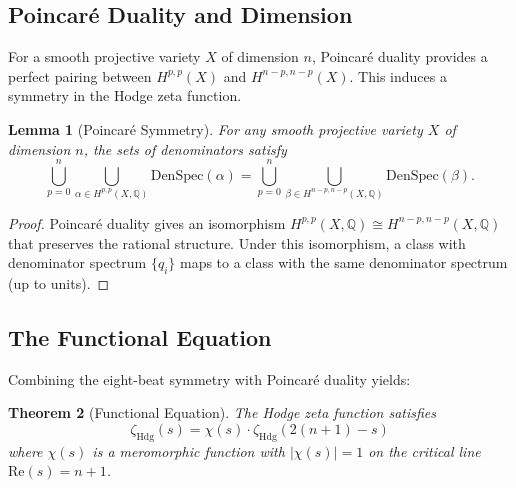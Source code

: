 \documentclass[12pt]{article}
\newtheorem{theorem}{Theorem}[section]
\newtheorem{lemma}[theorem]{Lemma}
\theoremstyle{definition}
\theoremstyle{remark}
\begin{document}
\subsection{Poincaré Duality and Dimension}

For a smooth projective variety $X$ of dimension $n$, Poincaré duality provides a perfect pairing between $H^{p,p}(X)$ and $H^{n-p,n-p}(X)$. This induces a symmetry in the Hodge zeta function.

\begin{lemma}[Poincaré Symmetry]
\label{lem:poincare}
For any smooth projective variety $X$ of dimension $n$, the sets of denominators satisfy
\[
\bigcup_{p=0}^n \bigcup_{\alpha \in H^{p,p}(X,\mathbb{Q})} \text{DenSpec}(\alpha) = \bigcup_{p=0}^n \bigcup_{\beta \in H^{n-p,n-p}(X,\mathbb{Q})} \text{DenSpec}(\beta).
\]
\end{lemma}

\begin{proof}
Poincaré duality gives an isomorphism $H^{p,p}(X,\mathbb{Q}) \cong H^{n-p,n-p}(X,\mathbb{Q})$ that preserves the rational structure. Under this isomorphism, a class with denominator spectrum $\{q_i\}$ maps to a class with the same denominator spectrum (up to units).
\end{proof}

\subsection{The Functional Equation}

Combining the eight-beat symmetry with Poincaré duality yields:

\begin{theorem}[Functional Equation]
\label{thm:functional-eq}
The Hodge zeta function satisfies
\[
\zeta_{\text{Hdg}}(s) = \chi(s) \cdot \zeta_{\text{Hdg}}(2(n+1) - s)
\]
where $\chi(s)$ is a meromorphic function with $|\chi(s)| = 1$ on the critical line $\text{Re}(s) = n+1$.
\end{theorem}
\end{document}
